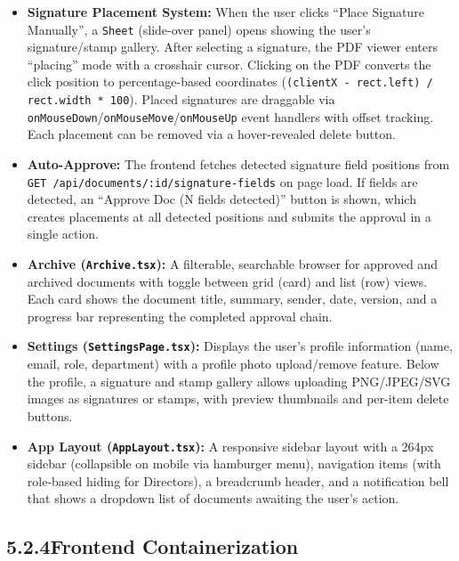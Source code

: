 \documentclass[12pt,a4paper]{report}
\begin{document}
\begin{itemize}
    \item \textbf{Signature Placement System:} When the user clicks ``Place Signature Manually'', a \texttt{Sheet} (slide-over panel) opens showing the user's signature/stamp gallery. After selecting a signature, the PDF viewer enters ``placing'' mode with a crosshair cursor. Clicking on the PDF converts the click position to percentage-based coordinates (\texttt{(clientX - rect.left) / rect.width * 100}). Placed signatures are draggable via \texttt{onMouseDown}/\texttt{onMouseMove}/\texttt{onMouseUp} event handlers with offset tracking. Each placement can be removed via a hover-revealed delete button.

    \item \textbf{Auto-Approve:} The frontend fetches detected signature field positions from \texttt{GET /api/documents/:id/signature-fields} on page load. If fields are detected, an ``Approve Doc (N fields detected)'' button is shown, which creates placements at all detected positions and submits the approval in a single action.

    \item \textbf{Archive (\texttt{Archive.tsx}):} A filterable, searchable browser for approved and archived documents with toggle between grid (card) and list (row) views. Each card shows the document title, summary, sender, date, version, and a progress bar representing the completed approval chain.

    \item \textbf{Settings (\texttt{SettingsPage.tsx}):} Displays the user's profile information (name, email, role, department) with a profile photo upload/remove feature. Below the profile, a signature and stamp gallery allows uploading PNG/JPEG/SVG images as signatures or stamps, with preview thumbnails and per-item delete buttons.

    \item \textbf{App Layout (\texttt{AppLayout.tsx}):} A responsive sidebar layout with a 264px sidebar (collapsible on mobile via hamburger menu), navigation items (with role-based hiding for Directors), a breadcrumb header, and a notification bell that shows a dropdown list of documents awaiting the user's action.
\end{itemize}

\subsection*{5.2.4\quad Frontend Containerization}
\end{document}
